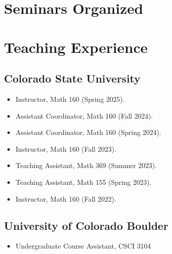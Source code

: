 \documentclass{cv_style}
\begin{document}
		\section{Seminars Organized}
		\begin{etaremune}
			\item {}
		\end{etaremune}
		
	\section{Teaching Experience}
	\subsection{Colorado State University}
	\begin{itemize}
		\item Instructor, Math 160 (Spring 2025).
		\item Assistant Coordinator, Math 160 (Fall 2024).
		\item Assistant Coordinator, Math 160 (Spring 2024).
		\item Instructor, Math 160 (Fall 2023).
		\item Teaching Assistant, Math 369 (Summer 2023).
		\item Teaching Assistant, Math 155 (Spring 2023).
		\item Instructor, Math 160 (Fall 2022).
	\end{itemize}
	\subsection{University of Colorado Boulder}
		\begin{itemize}
			\item Undergraduate Course Assistant, CSCI 3104
		\end{itemize}
		
	
	
\end{document}
